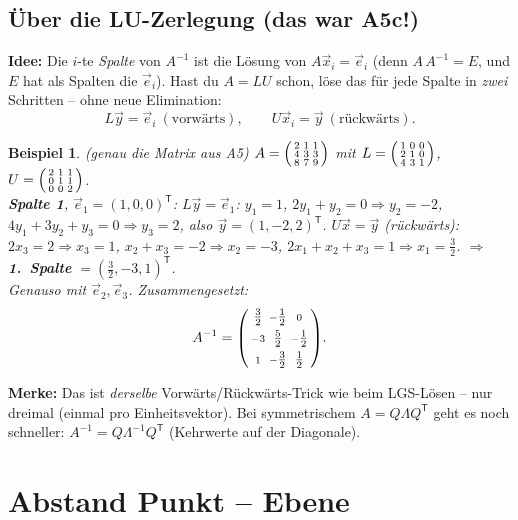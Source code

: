 \documentclass[a4paper,11pt]{article}
\newenvironment{psmallmatrix}{\left(\begin{smallmatrix}}{\end{smallmatrix}\right)}
\newcommand{\transp}{^{\mathsf{T}}}
\theoremstyle{def0}
\newtheorem*{bsp}{Beispiel}
\begin{document}
\subsection{Über die LU-Zerlegung (das war A5c!)}
\textbf{Idee:} Die $i$-te \emph{Spalte} von $A^{-1}$ ist die Lösung von
$A\vec x_i=\vec e_i$ (denn $A\,A^{-1}=E$, und $E$ hat als Spalten die $\vec e_i$).
Hast du $A=LU$ schon, löse das für jede Spalte in \emph{zwei} Schritten -- ohne neue
Elimination:
\[
  L\vec y=\vec e_i\ (\text{vorwärts}),\qquad U\vec x_i=\vec y\ (\text{rückwärts}).
\]
\begin{bsp}(genau die Matrix aus A5)
$A=\begin{psmallmatrix}2&1&1\\4&3&3\\8&7&9\end{psmallmatrix}$ mit
$L=\begin{psmallmatrix}1&0&0\\2&1&0\\4&3&1\end{psmallmatrix}$,
$U=\begin{psmallmatrix}2&1&1\\0&1&1\\0&0&2\end{psmallmatrix}$.\\[2pt]
\textbf{Spalte 1}, $\vec e_1=(1,0,0)\transp$:\;
$L\vec y=\vec e_1$: $y_1=1$, $2y_1+y_2=0\Rightarrow y_2=-2$,
$4y_1+3y_2+y_3=0\Rightarrow y_3=2$, also $\vec y=(1,-2,2)\transp$.\;
$U\vec x=\vec y$ (rückwärts): $2x_3=2\Rightarrow x_3=1$, $x_2+x_3=-2\Rightarrow x_2=-3$,
$2x_1+x_2+x_3=1\Rightarrow x_1=\tfrac32$. $\Rightarrow$ \textbf{1.\ Spalte} $=(\tfrac32,-3,1)\transp$.\\[2pt]
Genauso mit $\vec e_2,\vec e_3$. Zusammengesetzt:
\[
A^{-1}=\begin{psmallmatrix}\tfrac32&-\tfrac12&0\\[2pt]-3&\tfrac52&-\tfrac12\\[2pt]1&-\tfrac32&\tfrac12\end{psmallmatrix}.
\]
\end{bsp}
\textbf{Merke:} Das ist \emph{derselbe} Vorwärts/Rückwärts-Trick wie beim LGS-Lösen -- nur
dreimal (einmal pro Einheitsvektor). Bei symmetrischem $A=Q\Lambda Q\transp$ geht es noch
schneller: $A^{-1}=Q\Lambda^{-1}Q\transp$ (Kehrwerte auf der Diagonale).

\section{Abstand Punkt -- Ebene}
\end{document}
